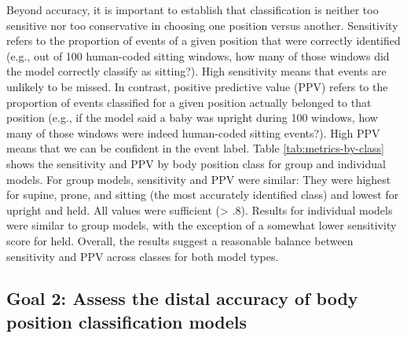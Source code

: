 \documentclass[
  man]{apa6}
\begin{document}
Beyond accuracy, it is important to establish that classification is neither too sensitive nor too conservative in choosing one position versus another. Sensitivity refers to the proportion of events of a given position that were correctly identified (e.g., out of 100 human-coded sitting windows, how many of those windows did the model correctly classify as sitting?). High sensitivity means that events are unlikely to be missed. In contrast, positive predictive value (PPV) refers to the proportion of events classified for a given position actually belonged to that position (e.g., if the model said a baby was upright during 100 windows, how many of those windows were indeed human-coded sitting events?). High PPV means that we can be confident in the event label. Table \ref{tab:metrics-by-class} shows the sensitivity and PPV by body position class for group and individual models. For group models, sensitivity and PPV were similar: They were highest for supine, prone, and sitting (the most accurately identified class) and lowest for upright and held. All values were sufficient (\textgreater{} .8). Results for individual models were similar to group models, with the exception of a somewhat lower sensitivity score for held. Overall, the results suggest a reasonable balance between sensitivity and PPV across classes for both model types.

\hypertarget{goal-2-assess-the-distal-accuracy-of-body-position-classification-models}{%
\subsection{Goal 2: Assess the distal accuracy of body position classification models}\label{goal-2-assess-the-distal-accuracy-of-body-position-classification-models}}
\end{document}
